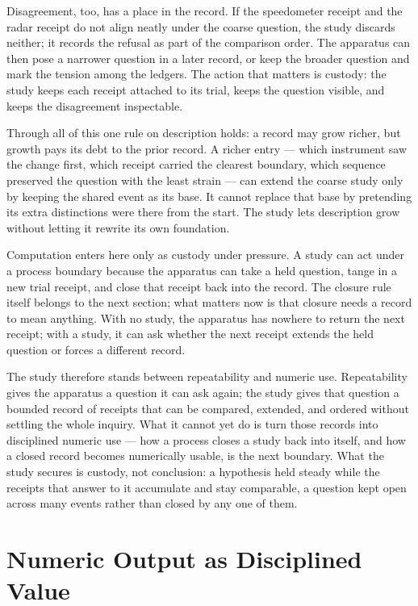 Disagreement, too, has a place in the record. If the speedometer receipt and the radar receipt do not align neatly under the coarse question, the study discards neither; it records the refusal as part of the comparison order. The apparatus can then pose a narrower question in a later record, or keep the broader question and mark the tension among the ledgers. The action that matters is custody: the study keeps each receipt attached to its trial, keeps the question visible, and keeps the disagreement inspectable.

Through all of this one rule on description holds: a record may grow richer, but growth pays its debt to the prior record. A richer entry --- which instrument saw the change first, which receipt carried the clearest boundary, which sequence preserved the question with the least strain --- can extend the coarse study only by keeping the shared event as its base. It cannot replace that base by pretending its extra distinctions were there from the start. The study lets description grow without letting it rewrite its own foundation.

Computation enters here only as custody under pressure. A study can act under a process boundary because the apparatus can take a held question, tange in a new trial receipt, and close that receipt back into the record. The closure rule itself belongs to the next section; what matters now is that closure needs a record to mean anything. With no study, the apparatus has nowhere to return the next receipt; with a study, it can ask whether the next receipt extends the held question or forces a different record.

The study therefore stands between repeatability and numeric use. Repeatability gives the apparatus a question it can ask again; the study gives that question a bounded record of receipts that can be compared, extended, and ordered without settling the whole inquiry. What it cannot yet do is turn those records into disciplined numeric use --- how a process closes a study back into itself, and how a closed record becomes numerically usable, is the next boundary. What the study secures is custody, not conclusion: a hypothesis held steady while the receipts that answer to it accumulate and stay comparable, a question kept open across many events rather than closed by any one of them.

\section{Numeric Output as Disciplined Value}

